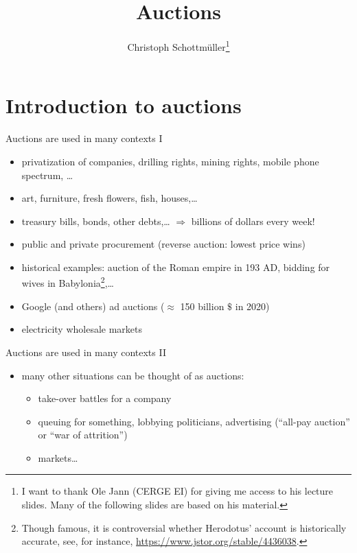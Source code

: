\documentclass[bigger]{beamer}
\author{Christoph Schottmüller\thanks{I want to thank Ole Jann (CERGE EI) for giving me access to his lecture slides. Many of the following slides are based on his material.}}
\date{}
\title{Auctions}
\begin{document}
\maketitle

\section{Introduction to auctions}
\label{sec:org938fe33}

\begin{frame}[label={sec:orge66a8d1}]{Auctions are used in many contexts I}
\begin{itemize}
\item privatization of companies, drilling rights, mining rights, mobile phone spectrum, \ldots{}
\item art, furniture, fresh ﬂowers, ﬁsh, houses,\ldots{}
\item treasury bills, bonds, other debts,\ldots{} \linebreak \(\Rightarrow\) billions of dollars every week!
\item public and private procurement (reverse auction: lowest price wins)
\item historical examples: auction of the Roman empire in 193 AD, bidding for wives in Babylonia\footnote{\tiny Though famous, it is controversial whether Herodotus' account is historically accurate, see, for instance, \url{https://www.jstor.org/stable/4436038}.},\ldots{}
\item Google (and others) ad auctions (\(\approx\) 150 billion \(\$\) in 2020)
\item electricity wholesale markets
\end{itemize}
\end{frame}
\begin{frame}[label={sec:orgc0687a6}]{Auctions are used in many contexts II}
\begin{itemize}
\item many other situations can be thought of as auctions:
\begin{itemize}
\item take-over battles for a company
\item queuing for something, lobbying politicians, advertising (“all-pay auction” or “war of attrition”)
\item markets\ldots{}
\end{itemize}
\end{itemize}
\end{frame}
\end{document}
